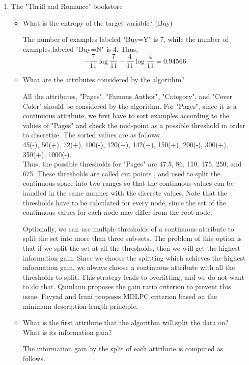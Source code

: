 \begin{enumerate}
\item The "Thrill and Romance" bookstore

\begin{itemize}
\item What is the entropy of the target variable? (Buy)

The number of examples labeled "Buy=Y" is 7, while the number of examples labeled "Buy=N" is 4. Thus,
\[
-\frac{7}{11}\log \frac{7}{11}-\frac{4}{11}\log \frac{4}{11}=0.94566
\]

\item What are the attributes considered by the algorithm?

All the attributes, "Pages", "Famous Author", "Category", and "Cover Color" should be considered by the algorithm. For "Pages", since it is a continuous attribute, we first have to sort examples according to the values of "Pages" and check the mid-point as a possible threshold in order to discretize. The sorted values are as follows:\\
45(-), 50(+), 72(+), 100(-), 120(+), 142(+), 150(+), 200(-), 300(+), 350(+), 1000(-).\\
Thus, the possible thresholds for "Pages" are 47.5, 86, 110, 175, 250, and 675. These thresholds are called cut points \cite{fayyad1992}, and used to split the continuous space into two ranges so that the continuous values can be handled in the same manner with the discrete values. Note that the thresholds have to be calculated for every node, since the set of the continuous values for each node may differ from the root node.

Optionally, we can use multple thresholds of a continuous attribute to split the set into more than three sub-sets. The problem of this option is that if we split the set at all the thresholds, then we will get the highest information gain. Since we choose the splitting which achieves the highest information gain, we always choose a continuous attribute with all the thresholds to split. This strategy leads to overfitting, and we do not want to do that. Quinlann \cite{quinlann1996} proposes the gain ratio criterion to prevent this issue. Fayyad and Irani \cite{fayyad1993} proposes MDLPC criterion based on the minimum description length principle.

\item What is the first attribute that the algorithm will split the data on? What is its information gain?

The information gain by the split of each attribute is computed as follows.


\end{itemize}
\end{enumerate}
